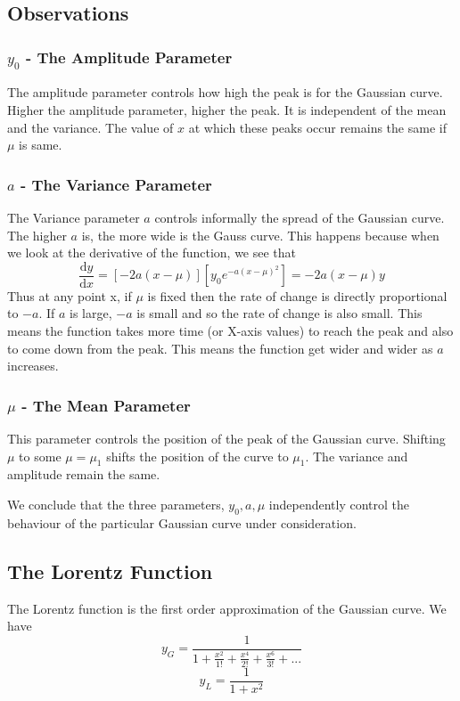 \documentclass{article}
\begin{document}
\subsection{Observations}
\subsubsection{$y_0$ - The Amplitude Parameter}
The amplitude parameter controls how high the peak is for the Gaussian curve. Higher the amplitude parameter, higher the peak. It is independent of the mean and the variance. The value of $x$ at which these peaks occur remains the same if $\mu$ is same.

\subsubsection{$a$ - The Variance Parameter}
The Variance parameter $a$ controls informally the spread of the Gaussian curve. The higher $a$ is, the more wide is the Gauss curve. This happens because when we look at the derivative of the function, we see that
$$\frac{\mathrm{d}y}{\mathrm{d}x} = [-2a(x-\mu)][y_0e^{-a(x-\mu)^2}] = -2a(x-\mu)y$$
Thus at any point x, if $\mu$ is fixed then the rate of change is directly proportional to $-a$. If $a$ is large, $-a$ is small and so the rate of change is also small. This means the function takes more time (or X-axis values) to reach the peak and also to come down from the peak. This means the function get wider and wider as $a$ increases.

\subsubsection{$\mu$ - The Mean Parameter}
This parameter controls the position of the peak of the Gaussian curve. Shifting $\mu$ to some $\mu = \mu_1$ shifts the position of the curve to $\mu_1$. The variance and amplitude remain the same.

\flushleft
We conclude that the three parameters, $y_0, a, \mu$ independently control the behaviour of the particular Gaussian curve under consideration.

\subsection{The Lorentz Function}
The Lorentz function is the first order approximation of the Gaussian curve. We have $$y_G = \frac{1}{1+\frac{x^2}{1!}+\frac{x^4}{2!}+\frac{x^6}{3!}+...}$$
$$y_L = \frac{1}{1+x^2}$$
\end{document}
